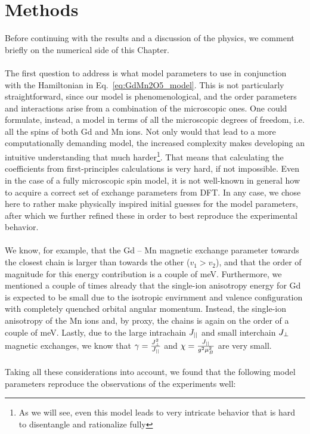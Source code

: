 \section{Methods}
Before continuing with the results and a discussion of the physics, we comment briefly on the numerical side of this Chapter.\\\\
The first question to address is what model parameters to use in conjunction with the Hamiltonian in Eq.~\eqref{eq:GdMn2O5_model}.
This is not particularly straightforward, since our model is phenomenological, and the order parameters and interactions arise from a combination of the microscopic ones.
One could formulate, instead, a model in terms of all the microscopic degrees of freedom, i.e. all the spins of both Gd and Mn ions.
Not only would that lead to a more computationally demanding model, the increased complexity makes developing an intuitive understanding that much harder\footnote{As we will see, even this model leads to very intricate behavior that is hard to disentangle and rationalize fully}.
That means that calculating the coefficients from first-principles calculations is very hard, if not impossible. Even in the case of a fully microscopic spin model, it is not well-known in general how to acquire a correct set of exchange parameters from DFT.
In any case, we chose here to rather make physically inspired initial guesses for the model parameters, after which we further refined these in order to best reproduce the experimental behavior.
\\\\
We know, for example, that the Gd -- Mn magnetic exchange parameter towards the closest chain is larger than towards the other ($v_1>v_2$), and that the order of magnitude for this energy contribution is a couple of meV.
Furthermore, we mentioned a couple of times already that the single-ion anisotropy energy for Gd is expected to be small due to the isotropic envirnment and valence configuration with completely quenched orbital angular momentum.
Instead, the single-ion anisotropy of the Mn ions and, by proxy, the chains is again on the order of a couple of meV.
Lastly, due to the large intrachain $J_{||}$ and small interchain $J_{\perp}$ magnetic exchanges, we know that $\gamma = \frac{J_{\perp}^2}{J_{||}}$ and $\chi = \frac{J_{||}}{g^2\mu_B^2}$ are very small.
\\\\
Taking all these considerations into account, we found that the following model parameters reproduce the observations of the experiments well:  
